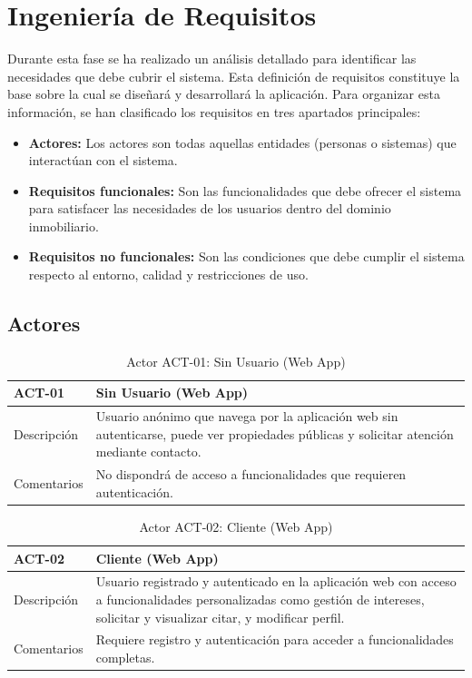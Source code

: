 \section{Ingeniería de Requisitos}


Durante esta fase se ha realizado un análisis detallado para identificar las necesidades que debe cubrir el sistema. Esta definición de requisitos constituye la base sobre la cual se diseñará y desarrollará la aplicación. Para organizar esta información, se han clasificado los requisitos en tres apartados principales:

\begin{itemize}
    \item \textbf{Actores:} Los actores son todas aquellas entidades (personas o sistemas) que interactúan con el sistema.
    \item \textbf{Requisitos funcionales:} Son las funcionalidades que debe ofrecer el sistema para satisfacer las necesidades de los usuarios dentro del dominio inmobiliario.
    \item \textbf{Requisitos no funcionales:} Son las condiciones que debe cumplir el sistema respecto al entorno, calidad y restricciones de uso.
\end{itemize}


\subsection{Actores}


\begin{table}[H]
\centering
\begin{tabular}{|p{3cm}|p{10cm}|}
\hline
\rowcolor{tealblue}
{\textbf{ACT-01}} & {\textbf{Sin Usuario (Web App)}} \\
\hline
Descripción & Usuario anónimo que navega por la aplicación web sin autenticarse, puede ver propiedades públicas y solicitar atención mediante contacto. \\
\hline
Comentarios & No dispondrá de acceso a funcionalidades que requieren autenticación. \\
\hline
\end{tabular}
\caption{Actor ACT-01: Sin Usuario (Web App)}
\end{table}

\begin{table}[H]
\centering
\begin{tabular}{|p{3cm}|p{10cm}|}
\hline
\rowcolor{tealblue}
{\textbf{ACT-02}} & {\textbf{Cliente (Web App)}} \\
\hline
Descripción & Usuario registrado y autenticado en la aplicación web con acceso a funcionalidades personalizadas como gestión de intereses, solicitar y visualizar citar, y modificar perfil. \\
\hline
Comentarios & Requiere registro y autenticación para acceder a funcionalidades completas. \\
\hline
\end{tabular}
\caption{Actor ACT-02: Cliente (Web App)}
\end{table}

